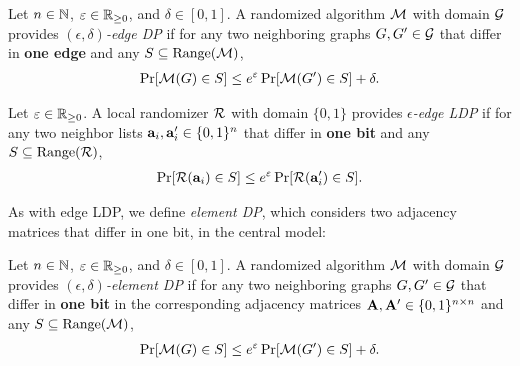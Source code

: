 \begin{definition}  \label{chap3-def:edge_DP} 
Let $n \in \mathbb{N}$, $\varepsilon \in \mathbb{R}_{\ge0}$, and $\delta \in [0,1]$. 
A randomized algorithm $\mathcal{M}$ with domain $\mathcal{G}$ provides \emph{$(\epsilon, \delta)$-edge DP} 
if for any two neighboring graphs $G, G' \in \mathcal{G}$ that differ in \textbf{one edge} and any $S \subseteq \mathrm{Range}(\mathcal{M})$, 
\begin{align*}
\Pr[\mathcal{M}(G) \in S] \leq e^\varepsilon \Pr[\mathcal{M}(G') \in S] + \delta.
\end{align*}
\end{definition}

\begin{definition}  \label{chap3-def:edge_LDP} 
Let $\varepsilon \in \mathbb{R}_{\ge0}$. 
A local randomizer $\mathcal{R}$ with domain $\{0,1\}$ provides \emph{$\epsilon$-edge LDP} if for any two neighbor lists $\mathbf{a}_i, \mathbf{a}'_i \in \{0,1\}^n$ that differ in \textbf{one bit} and any $S \subseteq \mathrm{Range}(\mathcal{R})$, 
\begin{align*}
\Pr[\mathcal{R}(\mathbf{a}_i) \in S] \leq e^\varepsilon \Pr[\mathcal{R}(\mathbf{a}'_i) \in S].
\end{align*}
\end{definition}

As with edge LDP,  
we define \textit{element DP}, which considers two adjacency matrices that differ in one bit, in the central model:

\begin{definition}  \label{chap3-def:element_DP} 
Let $n \in \mathbb{N}$, $\varepsilon \in \mathbb{R}_{\ge0}$, and $\delta \in [0,1]$. 
A randomized algorithm $\mathcal{M}$ with domain $\mathcal{G}$ provides \emph{$(\epsilon, \delta)$-element DP} 
if for any two neighboring graphs $G, G' \in \mathcal{G}$ that differ in \textbf{one bit} in the corresponding adjacency matrices $\mathbf{A}, \mathbf{A}' \in \{0,1\}^{n \times n}$
and any $S \subseteq \mathrm{Range}(\mathcal{M})$, 
\begin{align*}
\Pr[\mathcal{M}(G) \in S] \leq e^\varepsilon \Pr[\mathcal{M}(G') \in S] + \delta.
\end{align*}
\end{definition}

